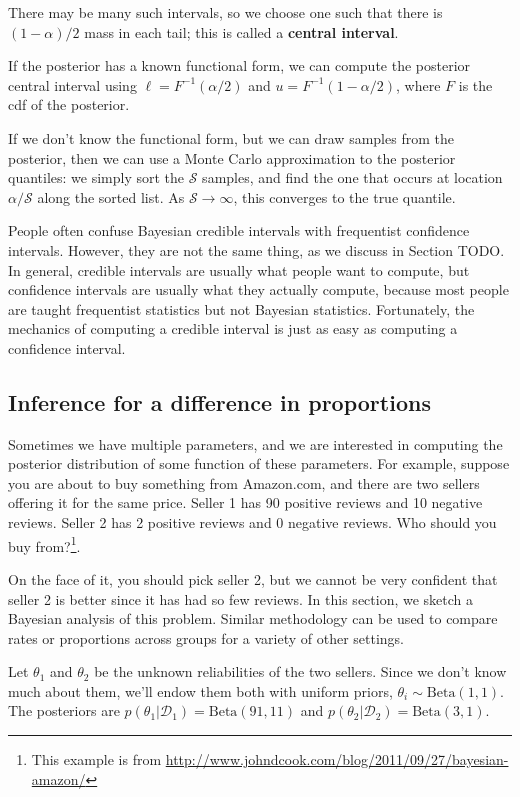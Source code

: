 There may be many such intervals, so we choose one such that there is $(1−\alpha)/2$ mass in each tail; this is called a \textbf{central interval}.

If the posterior has a known functional form, we can compute the posterior central interval using $\ell=F^{-1}(\alpha/2)$ and $u=F^{-1}(1-\alpha/2)$, where $F$ is the cdf of the posterior. 

If we don’t know the functional form, but we can draw samples from the posterior, then we can use a Monte Carlo approximation to the posterior quantiles: we simply sort the $\mathcal{S}$ samples, and find the one that occurs at location $\alpha/\mathcal{S}$ along the sorted list. As $\mathcal{S} \rightarrow \infty$, this converges to the true quantile. 

People often confuse Bayesian credible intervals with frequentist confidence intervals. However, they are not the same thing, as we discuss in Section TODO. In general, credible intervals are usually what people want to compute, but confidence intervals are usually what they actually compute, because most people are taught frequentist statistics but not Bayesian statistics. Fortunately, the mechanics of computing a credible interval is just as easy as computing a confidence interval. 


\subsection{Inference for a difference in proportions}
Sometimes we have multiple parameters, and we are interested in computing the posterior distribution of some function of these parameters. For example, suppose you are about to buy something from Amazon.com, and there are two sellers offering it for the same price. Seller 1 has 90 positive reviews and 10 negative reviews. Seller 2 has 2 positive reviews and 0 negative reviews. Who should you buy from?\footnote{This example is from \url{http://www.johndcook.com/blog/2011/09/27/bayesian-amazon/}}.

On the face of it, you should pick seller 2, but we cannot be very confident that seller 2 is better since it has had so few reviews. In this section, we sketch a Bayesian analysis of this problem. Similar methodology can be used to compare rates or proportions across groups for a variety of other settings.

Let $\theta_1$ and $\theta_2$ be the unknown reliabilities of the two sellers. Since we don’t know much about them, we’ll endow them both with uniform priors, $\theta_i \sim \text{Beta}(1,1)$. The posteriors are $p(\theta_1|\mathcal{D}_1)=\text{Beta}(91,11)$ and $p(\theta_2|\mathcal{D}_2)=\text{Beta}(3,1)$.


